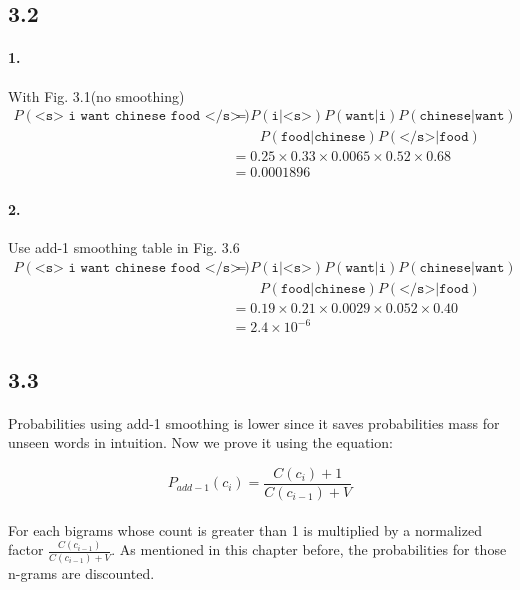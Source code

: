 \documentclass{article}
\begin{document}
\subsection*{3.2}

\paragraph{1.}
With Fig. 3.1(no smoothing)
\begin{align*}
    P(\texttt{<s> i want chinese food </s>})
     & = P(\texttt{i|<s>}) P(\texttt{want|i}) P(\texttt{chinese|want}) \\
     & \qquad P(\texttt{food|chinese}) P(\texttt{</s>|food})           \\
     & = 0.25 \times 0.33 \times 0.0065 \times 0.52 \times 0.68        \\
     & = 0.0001896
\end{align*}

\paragraph{2.}
Use add-1 smoothing table in Fig. 3.6
\begin{align*}
    P(\texttt{<s> i want chinese food </s>})
     & = P(\texttt{i|<s>}) P(\texttt{want|i})P(\texttt{chinese|want}) \\
     & \qquad P(\texttt{food|chinese}) P(\texttt{</s>|food})          \\
     & = 0.19 \times 0.21 \times 0.0029 \times 0.052 \times 0.40      \\
     & = 2.4 \times 10^{-6}
\end{align*}

\subsection*{3.3}

\paragraph{}
Probabilities using add-1 smoothing is lower since it saves probabilities
mass for unseen words in intuition. Now we prove it using the equation:

$$P_{add-1}(c_i) = \displaystyle\frac{C(c_i) + 1}{C(c_{i-1}) + V}$$

\paragraph{}
For each bigrams whose count is greater than 1
is multiplied by a normalized factor $\displaystyle\frac{C(c_{i-1})}{C(c_{i-1}) + V}$.
As mentioned in this chapter before, the probabilities for those n-grams are discounted.
\end{document}

